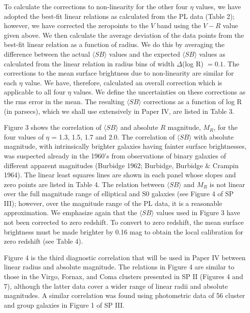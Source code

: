 \documentclass[preprint]{aastex}
\begin{document}
To calculate the corrections to non-linearity for the other four
$\eta$ values, we have adopted the best-fit linear relations as
calculated from the PL data (Table 2); however, we have corrected the
zeropoints to the $V$ band using the $V-R$ value given above. We then
calculate the average deviation of the data points from the best-fit
linear relation as a function of radius. We do this by averaging the
difference between the actual $\langle SB \rangle$ values and the
expected $\langle SB \rangle$ values as calculated from the linear
relation in radius bins of width $\Delta$(log R) $= 0.1$.  The
corrections to the mean surface brightness due to non-linearity are
similar for each $\eta$ value.  We have, therefore, calculated an
overall correction which is applicable to all four $\eta$ values. We
define the uncertainties on these corrections as the rms error in the
mean.  The resulting $\langle SB \rangle$ corrections as a function of
log R (in parsecs), which we shall use extensively in Paper IV, are
listed in Table 3.

Figure 3 shows the correlation of $\langle SB \rangle$ and absolute
$R$ magnitude, $M_R$, for the four values of $\eta$ = 1.3, 1.5, 1.7
and 2.0. The correlation of $\langle SB \rangle$ with absolute
magnitude, with intrinsically brighter galaxies having fainter surface
brightnesses, was suspected already in the 1960's from observations of
binary galaxies of different apparent magnitudes (Burbidge 1962;
Burbidge, Burbidge \& Crampin 1964). The linear least squares lines
are shown in each panel whose slopes and zero points are listed in
Table 4. The relation between $\langle SB \rangle$ and $M_R$ is not
linear over the full magnitude range of elliptical and S0 galaxies
(see Figure 4 of SP III); however, over the magnitude range of the PL
data, it is a reasonable approximation. We emphasize again that the
$\langle SB \rangle$ values used in Figure 3 have not been corrected
to zero redshift. To convert to zero redshift, the mean surface
brightness must be made brighter by 0.16 mag to obtain the local
calibration for zero redshift (see Table 4).

Figure 4 is the third diagnostic correlation that will be used in
Paper IV between linear radius and absolute magnitude.  The relations
in Figure 4 are similar to those in the Virgo, Fornax, and Coma
clusters presented in SP II (Figures 4 and 7), although the latter
data cover a wider range of linear radii and absolute magnitudes. A
similar correlation was found using photometric data of 56 cluster and
group galaxies in Figure 1 of SP III.
\end{document}
